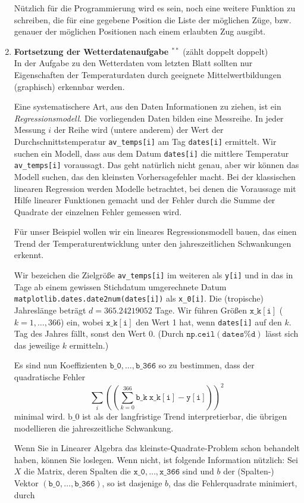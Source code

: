 \begin{enumerate}[1.]
Nützlich für die Programmierung wird es sein, noch eine weitere
Funktion zu schreiben, die für eine gegebene Position die Liste
der möglichen Züge, bzw. genauer der möglichen Positionen nach einem erlaubten Zug ausgibt.


\item \textbf{Fortsetzung der Wetterdatenaufgabe $^{**}$} (zählt doppelt doppelt)\\
In der Aufgabe zu den Wetterdaten vom letzten Blatt
sollten nur Eigenschaften der Temperaturdaten durch
geeignete Mittelwertbildungen (graphisch) erkennbar
werden.

Eine systematischere Art, aus den Daten Informationen
zu ziehen, ist ein \textit{Regressionsmodell}. Die vorliegenden
Daten bilden eine Messreihe. In jeder Messung $i$ der Reihe
wird (untere anderem) der Wert der Durchschnittstemperatur
\texttt{av\_temps[i]} am Tag \texttt{dates[i]} ermittelt. Wir suchen
ein Modell, dass aus dem Datum \texttt{dates[i]} die mittlere Temperatur
\texttt{av\_temps[i]} voraussagt. Das geht natürlich nicht genau,
aber wir können das Modell suchen, das den kleinsten Vorhersagefehler
macht. Bei der \glqq klassischen\grqq{} linearen Regression
werden Modelle betrachtet, bei denen die Voraussage mit Hilfe
linearer Funktionen gemacht und der Fehler durch die Summe
der Quadrate der einzelnen Fehler gemessen wird.

Für unser Beispiel wollen wir ein lineares Regressionsmodell
bauen, das einen Trend der Temperaturentwicklung unter den
jahreszeitlichen Schwankungen erkennt.

Wir bezeichen die Zielgröße \texttt{av\_temps[i]} im weiteren
als \texttt{y[i]} und in das in Tage ab einem gewissen Stichdatum umgerechnete
Datum \texttt{matplotlib.dates.date2num(dates[i])} als \texttt{x\_0[i]}.  Die (tropische)
Jahreslänge beträgt $d=365.24219052$ Tage. Wir führen Größen
$\mathtt{x\_k[i]}$ ($k=1,\ldots,366$) ein, wobei $\mathtt{x\_k[i]}$ den Wert 1 hat, wenn \texttt{dates[i]} auf den $k.$ Tag des Jahres fällt, sonst den Wert 0.
(Durch $\mathtt{np.ceil(dates\% d)}$ lässt sich das jeweilige $k$ ermitteln.)

Es sind nun Koeffizienten $\mathtt{b\_0,\ldots, b\_366}$ so zu bestimmen,
dass der quadratische Fehler
\[ \sum_i \left( \left(\sum_{k=0}^{366} \mathtt{b\_k \ x\_k[i] - y[i]}\right) \right)^2 \]
minimal wird.  $\mathrm{b\_0}$ ist als der langfristige Trend
interpretierbar, die übrigen modellieren die jahreszeitliche Schwankung.

Wenn Sie in Linearer Algebra das kleinste-Quadrate-Problem schon
behandelt haben, können Sie loslegen. Wenn nicht, ist folgende Information
nützlich: Sei $X$ die Matrix, deren Spalten die $\mathtt{x\_0,\ldots,x\_366}$ sind
und $b$ der (Spalten-) Vektor $\mathtt{(b\_0,\ldots, b\_366)}$, so ist
dasjenige $b$, das die Fehlerquadrate minimiert, durch


\end{enumerate}
